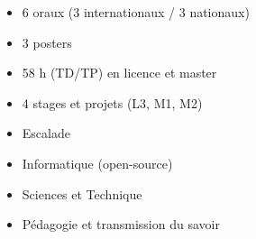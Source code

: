 \begin{itemize}
	\item 6 oraux (3 internationaux / 3 nationaux)
	\item 3 posters
\end{itemize}


\begin{itemize}
	\item 58 h (TD/TP) en licence et master
\end{itemize}

\begin{itemize}
	\item 4 stages et projets (L3, M1, M2)
\end{itemize}

\medskip
{}

\begin{itemize}
	\item Escalade
	\item Informatique (open-source)
	\item Sciences et Technique
	\item Pédagogie et transmission du savoir
\end{itemize}









%
%
%




